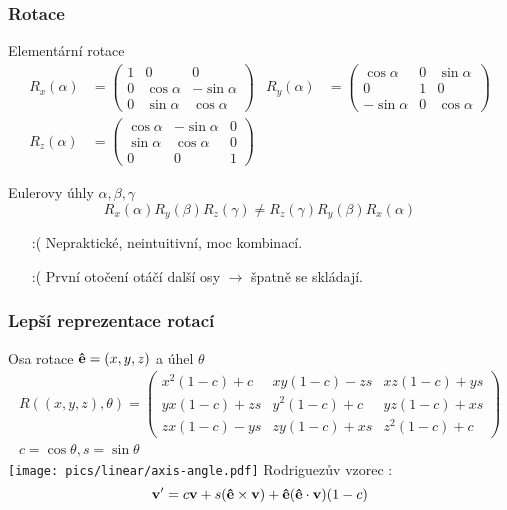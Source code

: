 \begin{frame}
    \frametitle{Rotace}

    Elementární rotace 
    \begin{align*}
        R_x(\alpha) &= \begin{pmatrix}
                1 & 0 & 0 \\
                0 & \cos \alpha & -\sin \alpha \\
                0 & \sin \alpha & \cos \alpha
            \end{pmatrix} &
        R_y(\alpha) &= \begin{pmatrix}
                \cos \alpha & 0 & \sin \alpha \\
                0 & 1 & 0 \\
                -\sin \alpha & 0 & \cos \alpha
            \end{pmatrix} \\
        R_z(\alpha) &= \begin{pmatrix}
                \cos \alpha & -\sin \alpha & 0 \\
                \sin \alpha & \cos \alpha & 0 \\
                0 & 0 & 1
            \end{pmatrix}
    \end{align*}

    \vfill

    Eulerovy úhly $\alpha, \beta, \gamma$
    \begin{equation*}
        R_x(\alpha)R_y(\beta)R_z(\gamma) \ne R_z(\gamma)R_y(\beta)R_x(\alpha)
    \end{equation*}
    \begin{itemize}
        \item[\color{red}:(] Nepraktické, neintuitivní, moc kombinací.
        \item[\color{red}:(] První otočení otáčí další osy $\rightarrow$ špatně se skládají.
    \end{itemize}
\end{frame}

\begin{frame}
    \frametitle{Lepší reprezentace rotací}

    Osa rotace $\mathbf{\hat{e}} = (x,y,z)$ a úhel $\theta$
    \begin{align*}
        R((x,y,z), \theta) = \begin{pmatrix}
            x^2(1-c) + c & xy(1-c) - zs & xz(1-c) + ys \\
            yx(1-c) + zs & y^2(1-c) + c & yz(1-c) + xs \\
            zx(1-c) - ys & zy(1-c) + xs & z^2(1-c) + c \end{pmatrix} \\
        c = \cos\theta, s = \sin\theta
    \end{align*}
    \vfill
    \texttt{[image: pics/linear/axis-angle.pdf]}
    \vfill
    Rodriguezův vzorec :
    \begin{equation*}
        \mathbf{v}' = c\mathbf{v} + s(\mathbf{\hat{e}}\times\mathbf{v}) + \mathbf{\hat{e}}(\mathbf{\hat{e}}\cdot\mathbf{v})(1-c)
    \end{equation*}
\end{frame}

